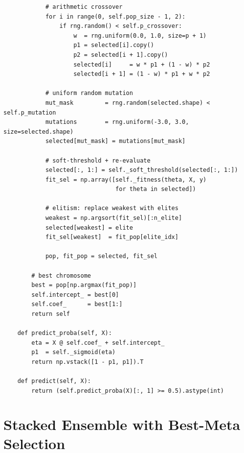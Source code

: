 \begin{lstlisting}
            # arithmetic crossover
            for i in range(0, self.pop_size - 1, 2):
                if rng.random() < self.p_crossover:
                    w  = rng.uniform(0.0, 1.0, size=p + 1)
                    p1 = selected[i].copy()
                    p2 = selected[i + 1].copy()
                    selected[i]     = w * p1 + (1 - w) * p2
                    selected[i + 1] = (1 - w) * p1 + w * p2

            # uniform random mutation
            mut_mask         = rng.random(selected.shape) < self.p_mutation
            mutations        = rng.uniform(-3.0, 3.0, size=selected.shape)
            selected[mut_mask] = mutations[mut_mask]

            # soft-threshold + re-evaluate
            selected[:, 1:] = self._soft_threshold(selected[:, 1:])
            fit_sel = np.array([self._fitness(theta, X, y)
                                for theta in selected])

            # elitism: replace weakest with elites
            weakest = np.argsort(fit_sel)[:n_elite]
            selected[weakest] = elite
            fit_sel[weakest]  = fit_pop[elite_idx]

            pop, fit_pop = selected, fit_sel

        # best chromosome
        best = pop[np.argmax(fit_pop)]
        self.intercept_ = best[0]
        self.coef_      = best[1:]
        return self

    def predict_proba(self, X):
        eta = X @ self.coef_ + self.intercept_
        p1  = self._sigmoid(eta)
        return np.vstack([1 - p1, p1]).T

    def predict(self, X):
        return (self.predict_proba(X)[:, 1] >= 0.5).astype(int)
\end{lstlisting}

\section{Stacked Ensemble with Best-Meta Selection}

